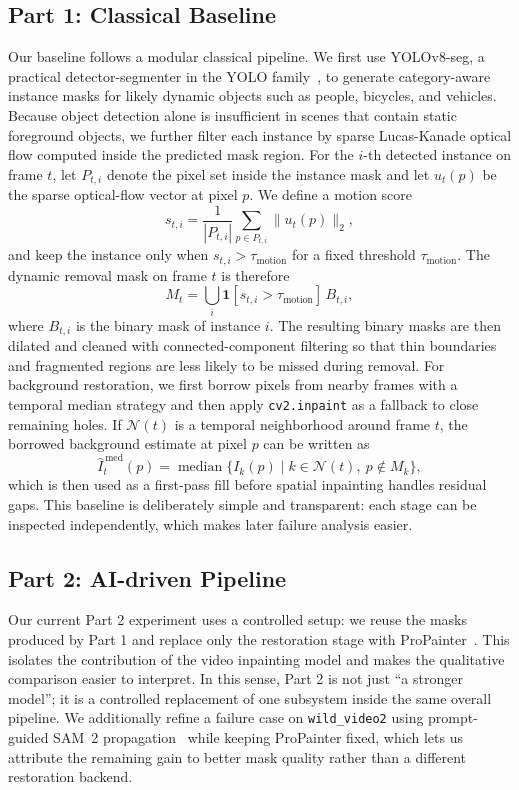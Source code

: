 \documentclass[10pt,twocolumn,letterpaper]{article}
\begin{document}
\subsection{Part 1: Classical Baseline}
Our baseline follows a modular classical pipeline.
We first use YOLOv8-seg, a practical detector-segmenter in the YOLO family~\cite{redmon2016yolo}, to generate category-aware instance masks for likely dynamic objects such as people, bicycles, and vehicles.
Because object detection alone is insufficient in scenes that contain static foreground objects, we further filter each instance by sparse Lucas-Kanade optical flow computed inside the predicted mask region.
For the $i$-th detected instance on frame $t$, let $P_{t,i}$ denote the pixel set inside the instance mask and let $u_t(p)$ be the sparse optical-flow vector at pixel $p$.
We define a motion score
\begin{equation}
  s_{t,i} = \frac{1}{|P_{t,i}|} \sum_{p \in P_{t,i}} \|u_t(p)\|_2,
\end{equation}
and keep the instance only when $s_{t,i} > \tau_{\text{motion}}$ for a fixed threshold $\tau_{\text{motion}}$.
The dynamic removal mask on frame $t$ is therefore
\begin{equation}
  M_t = \bigcup_i \mathbf{1}[s_{t,i} > \tau_{\text{motion}}] \, B_{t,i},
\end{equation}
where $B_{t,i}$ is the binary mask of instance $i$.
The resulting binary masks are then dilated and cleaned with connected-component filtering so that thin boundaries and fragmented regions are less likely to be missed during removal.
For background restoration, we first borrow pixels from nearby frames with a temporal median strategy and then apply \texttt{cv2.inpaint} as a fallback to close remaining holes.
If $\mathcal{N}(t)$ is a temporal neighborhood around frame $t$, the borrowed background estimate at pixel $p$ can be written as
\begin{equation}
  \hat{I}^{\,\text{med}}_t(p) = \operatorname{median}\{ I_k(p) \mid k \in \mathcal{N}(t),\ p \notin M_k \},
\end{equation}
which is then used as a first-pass fill before spatial inpainting handles residual gaps.
This baseline is deliberately simple and transparent: each stage can be inspected independently, which makes later failure analysis easier.

\subsection{Part 2: AI-driven Pipeline}
Our current Part 2 experiment uses a controlled setup: we reuse the masks produced by Part 1 and replace only the restoration stage with ProPainter~\cite{zhou2023propainter}.
This isolates the contribution of the video inpainting model and makes the qualitative comparison easier to interpret.
In this sense, Part 2 is not just ``a stronger model''; it is a controlled replacement of one subsystem inside the same overall pipeline.
We additionally refine a failure case on \texttt{wild\_video2} using prompt-guided SAM~2 propagation~\cite{ravi2024sam2} while keeping ProPainter fixed, which lets us attribute the remaining gain to better mask quality rather than a different restoration backend.
\end{document}

